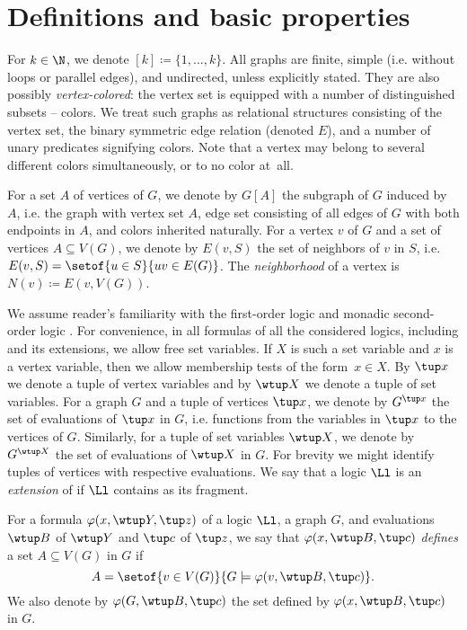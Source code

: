 \section{Definitions and basic properties}\label{sec:logics}

For $k\in \N$, we denote $[k]\coloneqq \{1,\ldots,k\}$.
All graphs are finite, simple (i.e. without loops or parallel edges), and undirected, unless explicitly stated. They are also possibly {\em{vertex-colored}}: the vertex set is equipped with a number of distinguished subsets -- colors.
We treat such graphs as relational structures consisting of the vertex set, the binary symmetric edge relation (denoted $E$), and a number of unary predicates signifying colors. Note that a vertex may belong to several different colors simultaneously, or to no color at~all.

For a set $A$ of vertices of $G$, we denote by $G[A]$ the subgraph of $G$ induced by $A$, i.e. the graph with vertex set $A$, edge set consisting of all edges of $G$ with both endpoints in $A$, and colors inherited naturally.
For a vertex $v$ of $G$ and a set of vertices $A \subseteq V(G)$, we denote by $E(v, S)$ the set of neighbors of $v$ in $S$, i.e. $E(v, S) = \setof{u \in S}{uv \in E(G)}$. The {\em{neighborhood}} of a vertex is $N(v)\coloneqq E(v,V(G))$.

We assume reader's familiarity with the first-order logic \fo and monadic second-order logic \mso. For convenience, in all formulas of all the considered logics, including \fo and its extensions, we allow free set variables. If $X$ is such a set variable and $x$ is a vertex variable, then we allow membership tests of the form~$x\in X$.
By $\tup x$ we denote a tuple of vertex variables and by $\wtup X$ we denote a tuple of set variables.
For a graph $G$ and a tuple of vertices $\tup x$, we denote by $G^{\tup x}$ the set of evaluations of $\tup x$ in $G$, i.e. functions from the variables in $\tup x$ to the vertices of $G$. Similarly, for a tuple of set variables $\wtup X$, we denote by $G^{\wtup X}$ the set of evaluations of $\wtup X$ in $G$.
For brevity we might identify tuples of vertices with respective evaluations.
We say that a logic $\Ll$ is an {\em{extension}} of \fo if $\Ll$ contains \fo as its fragment.

For a formula $\varphi(x, \wtup Y, \tup z)$ of a logic $\Ll$, a graph $G$, and evaluations $\wtup B$ of $\wtup Y$ and $\tup c$ of $\tup z$, we say that $\varphi(x, \wtup B, \tup c)$ {\em{defines}} a set $A \subseteq V(G)$ in $G$ if
\[
    A = \setof{v \in V(G)}{G \models \varphi(v, \wtup B, \tup c)}.
\]
We also denote by $\varphi(G, \wtup B, \tup c)$ the set defined by $\varphi(x, \wtup B, \tup c)$ in $G$.

